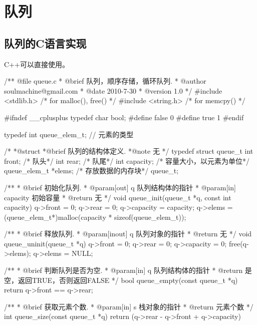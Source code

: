 \section{队列} %

\subsection{队列的C语言实现}
C++可以直接使用。

\begin{Codex}[label=queue.c]
/** @file queue.c
  * @brief 队列，顺序存储，循环队列.
  * @author soulmachine@gmail.com
  * @date 2010-7-30
  * @version 1.0
  */
#include <stdlib.h> /* for malloc(), free() */
#include <string.h> /* for memcpy() */

#ifndef __cplusplus 
typedef char bool;
#define false 0
#define true 1
#endif

typedef int queue_elem_t; // 元素的类型

/*
  *@struct
  *@brief 队列的结构体定义.
  *@note 无
  */
typedef struct queue_t {
    int front;   /* 队头*/
    int rear;    /* 队尾*/
    int capacity; /* 容量大小，以元素为单位*/
    queue_elem_t *elems; /* 存放数据的内存块*/
}queue_t;

/** 
  * @brief 初始化队列.
  * @param[out] q 队列结构体的指针
  * @param[in] capacity 初始容量
  * @return 无
  */
void queue_init(queue_t *q, const int capacity) {
    q->front = 0;
    q->rear = 0;
    q->capacity = capacity;
    q->elems = (queue_elem_t*)malloc(capacity * sizeof(queue_elem_t));
}

/** 
  * @brief 释放队列.
  * @param[inout] q 队列对象的指针
  * @return 无
  */
void queue_uninit(queue_t *q) {
    q->front = 0;
    q->rear = 0;
    q->capacity = 0;
    free(q->elems);
    q->elems = NULL;
}

/** 
  * @brief 判断队列是否为空.
  * @param[in] q 队列结构体的指针
  * @return 是空，返回TRUE，否则返回FALSE
  */
bool queue_empty(const queue_t *q) {
    return q->front == q->rear;
}

/** 
 * @brief 获取元素个数.
 * @param[in] s 栈对象的指针
 * @return 元素个数
 */
int queue_size(const queue_t *q) {
    return (q->rear - q->front + q->capacity) %
}


\end{Codex}
